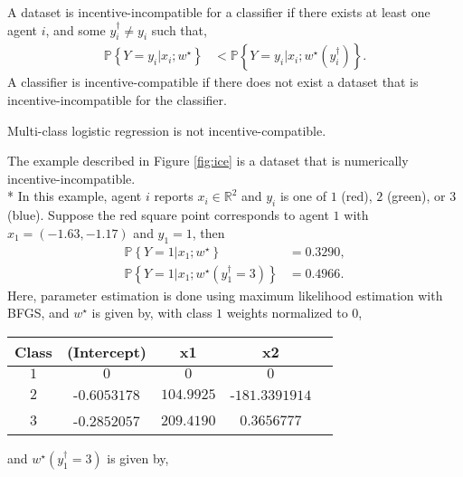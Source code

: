 \documentclass{article}
\begin{document}
\begin{df} \label{df:ic} 
A dataset is incentive-incompatible for a classifier if there exists at least one agent $i $, and some $y^{\dagger}_{i} \neq  y_{i}$ such that,
\begin{align*}
\mathbb{P}\left\{Y = y_{i} | x_{i}; w^\star \right\} &< \mathbb{P}\left\{Y = y_{i} | x_{i}; w^\star \left(y^{\dagger}_{i}\right)\right\}.
\end{align*}
A classifier is incentive-compatible if there does not exist a dataset that is incentive-incompatible for the classifier.
\newline \newline\end{df}
\begin{conj} \label{conj:logit} 
Multi-class logistic regression is not incentive-compatible.
\newline \newline\end{conj}
The example described in Figure \ref{fig:ice} is a dataset that is numerically incentive-incompatible.
\\* In this example, agent $i $ reports $x_{i} \in \mathbb{R}^{2}$ and $y_{i}$ is one of $1$ (red), $2$ (green), or $3$ (blue). Suppose the red square point corresponds to agent $1$ with $x_{1} = \left(-1.63, -1.17\right)$ and $y_{1} = 1$, then
\begin{align*}
\mathbb{P}\left\{Y = 1 | x_{1} ; w^\star \right\} &= 0.3290,
\\ \mathbb{P}\left\{Y = 1 | x_{1} ; w^\star \left(y^{\dagger}_{1} = 3\right)\right\} &= 0.4966.
\end{align*}
Here, parameter estimation is done using maximum likelihood estimation with BFGS, and $w^\star $ is given by, with class $1$ weights normalized to $0$,

\begin{center} \begin{tabular}{|c|c|c|c|c|}
\hline
 Class &(Intercept) &x1 &x2\\ \hline
$1$ &$0$ &$0$ &$0$\\ \hline
$2$ &-$0.6053178$ &$104.9925$ &-$181.3391914$\\ \hline
$3$ &-$0.2852057$ &$209.4190$ &$0.3656777$\\ \hline
\end{tabular} \end{center}
and $w^\star \left(y^{\dagger}_{1} = 3\right)$ is given by,
\end{document}
